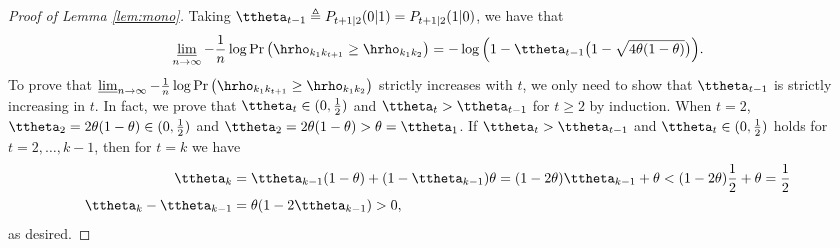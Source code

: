 \documentclass[11pt,onecolumn]{article}
\begin{document}
\begin{proof}[Proof of Lemma \ref{lem:mono}]
	Taking $\ttheta_{t-1}\triangleq P_{t+1|2}(0|1)=P_{t+1|2}(1|0)$, we have that
	\begin{align}
		\varliminf_{n\rightarrow \infty}-\frac{1}{n}\log\Pr\big(\hrho_{k_{1}k_{t+1}}\geq \hrho_{k_{1}k_{2}}\big)=-\log\Big(1-\ttheta_{t-1}\big(1-\sqrt{4\theta(1-\theta)}\big)\Big).
	\end{align}
	To prove that $\varliminf_{n\rightarrow \infty}-\frac{1}{n}\log \Pr\big(\hrho_{k_{1}k_{t+1}}\geq \hrho_{k_{1}k_{2}}\big)$ strictly increases with   $t$, we only need to show that 
	$\ttheta_{t-1}$ is strictly increasing in $t$. In fact, we prove that $\ttheta_{t}\in(0,\frac{1}{2})$ and $\ttheta_{t}>\ttheta_{t-1}$ for $t\geq 2$ by induction. When 
	$t=2$, $\ttheta_{2}=2\theta(1-\theta)\in (0,\frac{1}{2})$ and $\ttheta_{2}=2\theta(1-\theta)>\theta=\ttheta_{1}$. If $\ttheta_{t}>\ttheta_{t-1}$ and $\ttheta_{t}\in(0,\frac{1}{2})$ holds 
	for $t=2,\ldots,k-1$, then for $t=k$ we have
	\begin{align}
		\ttheta_{k}&=\ttheta_{k-1}(1-\theta)+(1-\ttheta_{k-1})\theta=(1-2\theta)\ttheta_{k-1}+\theta<(1-2\theta)\frac{1}{2}+\theta=\frac{1}{2}\\*
		\ttheta_{k}-\ttheta_{k-1}&=\theta(1-2\ttheta_{k-1})>0,
	\end{align}
	as desired.
\end{proof}
\end{document}
